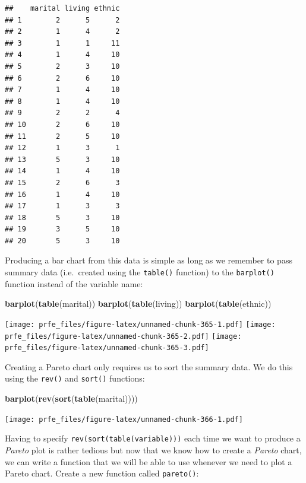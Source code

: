 \documentclass[12pt,a4paper]{book}
\newenvironment{Shaded}{\begin{snugshade}}{\end{snugshade}}
\newcommand{\KeywordTok}[1]{\textcolor[rgb]{0.13,0.29,0.53}{\textbf{#1}}}
\newcommand{\NormalTok}[1]{#1}
\theoremstyle{definition}
\theoremstyle{definition}
\theoremstyle{definition}
\theoremstyle{remark}
\begin{document}
\begin{verbatim}
##    marital living ethnic
## 1        2      5      2
## 2        1      4      2
## 3        1      1     11
## 4        1      4     10
## 5        2      3     10
## 6        2      6     10
## 7        1      4     10
## 8        1      4     10
## 9        2      2      4
## 10       2      6     10
## 11       2      5     10
## 12       1      3      1
## 13       5      3     10
## 14       1      4     10
## 15       2      6      3
## 16       1      4     10
## 17       1      3      3
## 18       5      3     10
## 19       3      5     10
## 20       5      3     10
\end{verbatim}

Producing a bar chart from this data is simple as long as we remember to
pass summary data (i.e.~created using the \texttt{table()} function) to
the \texttt{barplot()} function instead of the variable name:

\begin{Shaded}
\begin{Highlighting}[]
\KeywordTok{barplot}\NormalTok{(}\KeywordTok{table}\NormalTok{(marital))}
\KeywordTok{barplot}\NormalTok{(}\KeywordTok{table}\NormalTok{(living))}
\KeywordTok{barplot}\NormalTok{(}\KeywordTok{table}\NormalTok{(ethnic))}
\end{Highlighting}
\end{Shaded}

\texttt{[image: prfe\_files/figure-latex/unnamed-chunk-365-1.pdf]}
\texttt{[image: prfe\_files/figure-latex/unnamed-chunk-365-2.pdf]}
\texttt{[image: prfe\_files/figure-latex/unnamed-chunk-365-3.pdf]}

Creating a Pareto chart only requires us to sort the summary data. We do
this using the \texttt{rev()} and \texttt{sort()} functions:

\begin{Shaded}
\begin{Highlighting}[]
\KeywordTok{barplot}\NormalTok{(}\KeywordTok{rev}\NormalTok{(}\KeywordTok{sort}\NormalTok{(}\KeywordTok{table}\NormalTok{(marital))))}
\end{Highlighting}
\end{Shaded}

\texttt{[image: prfe\_files/figure-latex/unnamed-chunk-366-1.pdf]}

Having to specify \texttt{rev(sort(table(variable)))} each time we want
to produce a \emph{Pareto} plot is rather tedious but now that we know
how to create a \emph{Pareto} chart, we can write a function that we
will be able to use whenever we need to plot a Pareto chart. Create a
new function called \texttt{pareto()}:
\end{document}

